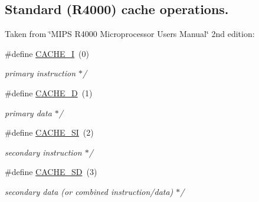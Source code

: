 \subsection*{Standard (R4000) cache operations.}
\label{_amgrp58fa76ef0fbc4fb67a057a8fdd84fe55}%
Taken from \char`\"{}\+M\+I\+P\+S R4000 Microprocessor User\textquotesingle{}s Manual\char`\"{} 2nd edition\+: \begin{DoxyCompactItemize}
\item 
\mbox{\label{group__mips__regs_gac038c307d75c414069699d4c2741714f}} 
\#define \mbox{\hyperlink{group__mips__regs_gac038c307d75c414069699d4c2741714f}{C\+A\+C\+H\+E\+\_\+I}}~(0)
\begin{DoxyCompactList}\small\item\em primary instruction $\ast$/ \end{DoxyCompactList}\item 
\mbox{\label{group__mips__regs_ga0fba561a0aa459e322839f78cc09f839}} 
\#define \mbox{\hyperlink{group__mips__regs_ga0fba561a0aa459e322839f78cc09f839}{C\+A\+C\+H\+E\+\_\+D}}~(1)
\begin{DoxyCompactList}\small\item\em primary data $\ast$/ \end{DoxyCompactList}\item 
\mbox{\label{group__mips__regs_gaa127e30b313e010b0c7b53c97503b6ce}} 
\#define \mbox{\hyperlink{group__mips__regs_gaa127e30b313e010b0c7b53c97503b6ce}{C\+A\+C\+H\+E\+\_\+\+SI}}~(2)
\begin{DoxyCompactList}\small\item\em secondary instruction $\ast$/ \end{DoxyCompactList}\item 
\mbox{\label{group__mips__regs_gae713c0e6cb5df3df0030d5d87bb16a6d}} 
\#define \mbox{\hyperlink{group__mips__regs_gae713c0e6cb5df3df0030d5d87bb16a6d}{C\+A\+C\+H\+E\+\_\+\+SD}}~(3)
\begin{DoxyCompactList}\small\item\em secondary data (or combined instruction/data) $\ast$/ \end{DoxyCompactList}\item 
\mbox{\label{group__mips__regs_ga3e91cd07b1e94f7658a7d5547a9118d6}} 

\end{DoxyCompactItemize}
